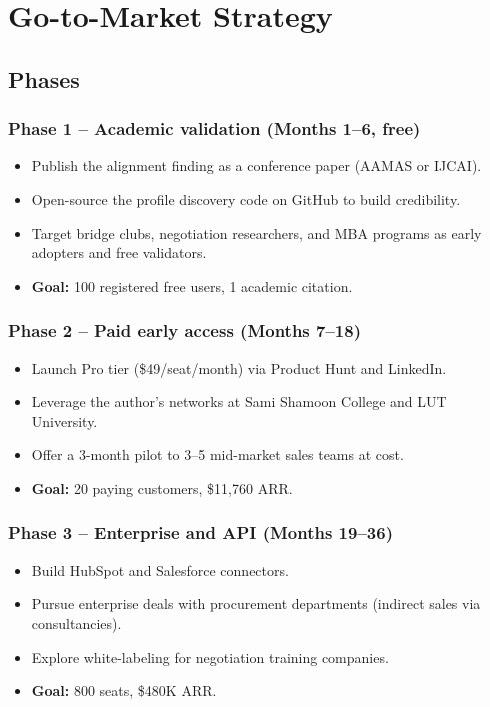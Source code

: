 \documentclass[11pt, a4paper, oneside]{report}
\begin{document}
\chapter{Go-to-Market Strategy}
\label{ch:gtm}

\section{Phases}

\subsection*{Phase 1 -- Academic validation (Months 1--6, free)}
\begin{itemize}[leftmargin=*]
    \item Publish the alignment finding as a conference paper (AAMAS or IJCAI).
    \item Open-source the profile discovery code on GitHub to build credibility.
    \item Target bridge clubs, negotiation researchers, and MBA programs as
          early adopters and free validators.
    \item \textbf{Goal:} 100 registered free users, 1 academic citation.
\end{itemize}

\subsection*{Phase 2 -- Paid early access (Months 7--18)}
\begin{itemize}[leftmargin=*]
    \item Launch Pro tier (\$49/seat/month) via Product Hunt and LinkedIn.
    \item Leverage the author's networks at Sami Shamoon College and LUT University.
    \item Offer a 3-month pilot to 3--5 mid-market sales teams at cost.
    \item \textbf{Goal:} 20 paying customers, \$11{,}760 ARR.
\end{itemize}

\subsection*{Phase 3 -- Enterprise and API (Months 19--36)}
\begin{itemize}[leftmargin=*]
    \item Build HubSpot and Salesforce connectors.
    \item Pursue enterprise deals with procurement departments (indirect sales
          via consultancies).
    \item Explore white-labeling for negotiation training companies.
    \item \textbf{Goal:} 800 seats, \$480K ARR.
\end{itemize}
\end{document}
